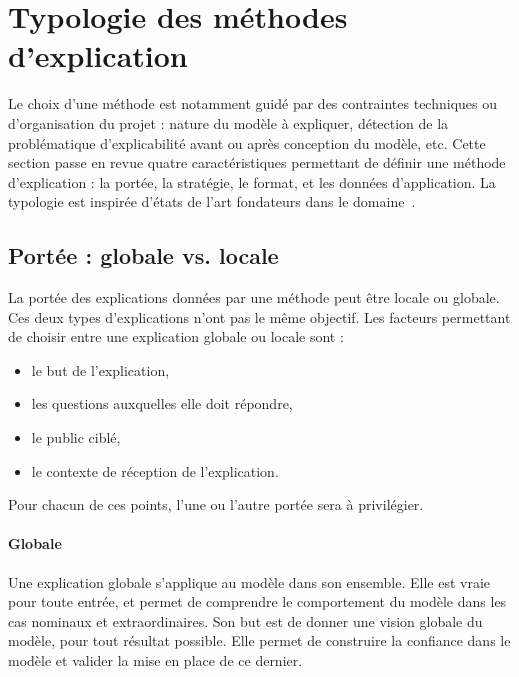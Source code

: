 \section{Typologie des méthodes d'explication} \label{C1:typologie}

Le choix d'une méthode est notamment guidé par des contraintes techniques ou d'organisation du projet : nature du modèle à expliquer, détection de la problématique d'explicabilité avant ou après conception du modèle, etc. Cette section passe en revue quatre caractéristiques permettant de définir une méthode d'explication : la portée, la stratégie, le format, et les données d'application. La typologie est inspirée d'états de l'art fondateurs dans le domaine~\cite{Guidotti2018, Gilpin2018, Dam2018, Hohman2018, molnar2019, Beaudouin2020, Arrieta2020}.

\subsection{Portée : globale vs. locale}

La portée des explications données par une méthode peut être locale ou globale. Ces deux types d'explications n'ont pas le même objectif.
Les facteurs permettant de choisir entre une explication globale ou locale sont :
\begin{itemize}
    \item le but de l'explication,
    \item les questions auxquelles elle doit répondre,
    \item le public ciblé,
    \item le contexte de réception de l'explication.
\end{itemize}
Pour chacun de ces points, l'une ou l'autre portée sera à privilégier.

\paragraph{Globale}

Une explication globale s'applique au modèle dans son ensemble. Elle est vraie pour toute entrée, et permet de comprendre le comportement du modèle dans les cas nominaux et extraordinaires.
Son but est de donner une vision globale du modèle, pour tout résultat possible.
Elle permet de construire la confiance dans le modèle et valider la mise en place de ce dernier.

